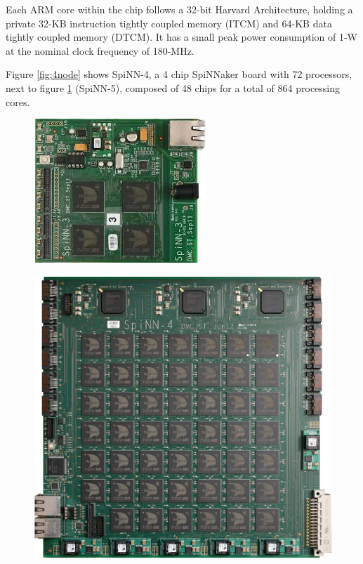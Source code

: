 Each ARM core within the chip follows a 32-bit Harvard Architecture, holding a private 32-KB instruction tightly coupled memory (ITCM) and 64-KB data tightly coupled memory (DTCM).\cite{painkras} It has a small peak power consumption of 1-W at the nominal clock frequency of 180-MHz.\cite{arm968}

Figure \ref{fig:4node} shows SpiNN-4, a 4 chip SpiNNaker board with 72 processors, next to figure \ref{fig:48node} (SpiNN-5), composed of 48 chips for a total of 864 processing cores.

\begin{figure}
\centering
\begin{minipage}{.5\textwidth}
  \centering
  \includegraphics[width=0.4\linewidth, natwidth=245, natheight=205]{images/4node.jpg}
  \label{fig:4node}
\end{minipage}%
\begin{minipage}{.5\textwidth}
  \centering
  \includegraphics[width=0.9\linewidth, natwidth=945, natheight=896]{images/48node.jpg}
  \label{fig:48node}
\end{minipage}
\end{figure}

